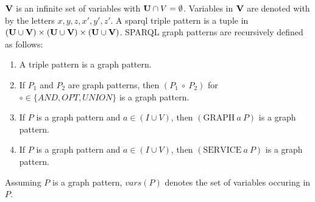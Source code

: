 \bigskip
\begin{definition}
	$\mathbf{V}$ is an infinite set of variables with $\mathbf{U} \cap V = \emptyset$. 
	Variables in $\mathbf{V}$ are denoted with by the letters $x,y,z,x',y',z'$. 
	A sparql triple pattern is a tuple in 
	$(\mathbf{U} \cup \mathbf{V}) \times (\mathbf{U} \cup \mathbf{V}) \times (\mathbf{U} \cup \mathbf{V})$. 
	SPARQL graph patterns are recursively defined as follows:
	\begin{enumerate}
		\item A triple pattern is a graph pattern.
		\item If $P_1$ and $P_2$ are graph patterns, then $(P_1  \ \circ \ P_2)$ for
			$\circ \in \{ AND, OPT, UNION\}$ is a graph pattern.
		\item If $P$ is a graph pattern and $a \in (I \cup V)$, then $(\mbox{GRAPH} \  a \ P)$ is a graph pattern.
		\item If $P$ is a graph pattern and $a \in (I \cup V)$, then $(\mbox{SERVICE} \  a \ P)$ is a graph pattern.
	\end{enumerate}
	\noindent Assuming $P$ is a graph pattern, $vars(P)$ denotes the set of variables occuring in $P$.
\end{definition}

